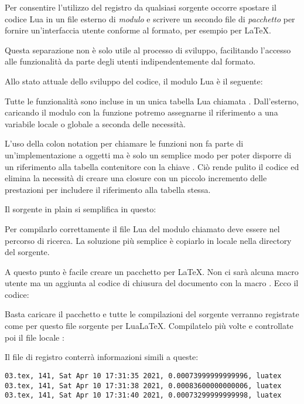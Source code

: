 Per consentire l'utilizzo del registro da qualsiasi sorgente occorre spostare il
codice Lua in un file esterno di \emph{modulo} e scrivere un secondo file di
\emph{pacchetto} per fornire un'interfaccia utente conforme al formato, per
esempio per \LaTeX{}.

Questa separazione non è solo utile al processo di sviluppo, facilitando
l'accesso alle funzionalità da parte degli utenti indipendentemente dal formato.

Allo stato attuale dello sviluppo del codice, il modulo Lua è il seguente:

Tutte le funzionalità sono incluse in un unica tabella Lua chiamata
. Dall'esterno, caricando il modulo con la funzione 
potremo assegnarne il riferimento a una variabile locale o globale a seconda
delle necessità.

L'uso della colon notation per chiamare le funzioni non fa parte di
un'implementazione a oggetti ma è solo un semplice modo per poter disporre di un
riferimento alla tabella contenitore con la chiave . Ciò rende pulito
il codice ed elimina la necessità di creare una closure con un piccolo
incremento delle prestazioni per includere il riferimento alla tabella stessa.

Il sorgente in plain \LuaTeX{} si semplifica in questo:

Per compilarlo correttamente il file Lua del modulo chiamato
 deve essere nel percorso di ricerca. La soluzione più
semplice è copiarlo in locale nella directory del sorgente.

A questo punto è facile creare un pacchetto per \LaTeX{}. Non ci sarà alcuna
macro utente ma un aggiunta al codice di chiusura del documento con la macro
. Ecco il codice:

Basta caricare il pacchetto e tutte le compilazioni del sorgente verranno
registrate come per questo file sorgente per Lua\LaTeX{}. Compilatelo più volte
e controllate poi il file locale :

Il file di registro conterrà informazioni simili a queste:
\begin{Verbatim}[numbers=none,xleftmargin=0pt]
03.tex, 141, Sat Apr 10 17:31:35 2021, 0.00073999999999996, luatex
03.tex, 141, Sat Apr 10 17:31:38 2021, 0.00083600000000006, luatex
03.tex, 141, Sat Apr 10 17:31:40 2021, 0.00073299999999998, luatex
\end{Verbatim}


